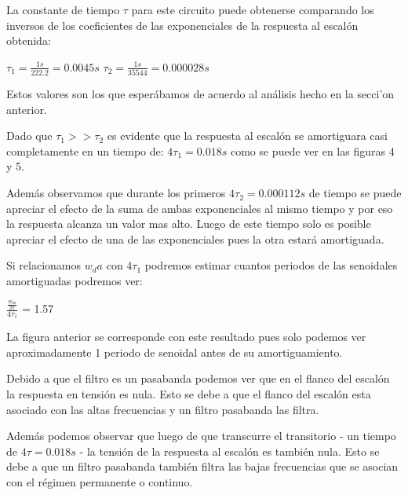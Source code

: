 \documentclass[12pt, titlepage]{article}
\begin{document}
    
    La constante de tiempo $\tau$ para este circuito puede obtenerse comparando los inversos de los coeficientes de las exponenciales de la respuesta al escalón obtenida: 
    
     \begin{center}
        $\tau_1 = \frac{1s}{222.2} = 0.0045s$ \hspace{5mm} $\tau_2 = \frac{1s}{35544} = 0.000028s$ 
    \end{center}
    
    Estos valores son los que esperábamos de acuerdo al análisis hecho en la secci'on anterior.
    
    Dado que $\tau_1 >> \tau_2$ es evidente que la respuesta al escalón se amortiguara casi completamente en un tiempo de: $4\tau_1 = 0.018s$ como se puede ver en las figuras 4 y 5.
    
    Además observamos que durante los primeros $4\tau_2 = 0.000112s$ de tiempo se puede apreciar el efecto de la suma de ambas exponenciales al mismo tiempo y por eso la respuesta alcanza un valor mas alto. Luego de este tiempo solo es posible apreciar el efecto de una de las exponenciales pues la otra estará amortiguada.
    
    Si relacionamos $w_da$ con $4\tau_1$ podremos estimar cuantos periodos de las senoidales amortiguadas podremos ver:
    
    \begin{center}
        $\frac{\frac{w_{da}}{2\pi}}{4\tau_1}$ = 1.57
    \end{center}
    
    La figura anterior se corresponde con este resultado pues solo podemos ver aproximadamente 1 periodo de senoidal antes de su amortiguamiento.
    
    Debido a que el filtro es un pasabanda podemos ver que en el flanco del escalón la respuesta en tensión es nula. Esto se debe a que el flanco del escalón esta asociado con las altas frecuencias y un filtro pasabanda las filtra. 
    
    Además podemos observar que luego de que transcurre el transitorio - un tiempo de $4\tau = 0.018s$ - la tensión de la respuesta al escalón es también nula. Esto se debe a que un filtro pasabanda también filtra las bajas frecuencias que se asocian con el régimen permanente o continuo. 
    
   
    
\end{document}
